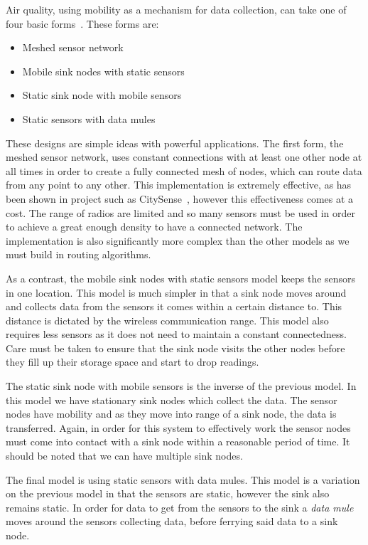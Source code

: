     Air quality, using mobility as a mechanism for data collection, can take one of four basic forms~\cite{datacollectionsurvey}. These forms are:

    \begin{itemize}
        \item Meshed sensor network
        \item Mobile sink nodes with static sensors
        \item Static sink node with mobile sensors
        \item Static sensors with data mules~\cite{datamulesthreeteir}
    \end{itemize}

    These designs are simple ideas with powerful applications. The first form, the meshed sensor network, uses constant connections with at least one other node at all times in order to create a fully connected mesh of nodes, which can route data from any point to any other. This implementation is extremely effective, as has been shown in project such as CitySense~\cite{citysense}, however this effectiveness comes at a cost. The range of radios are limited and so many sensors must be used in order to achieve a great enough density to have a connected network. The implementation is also significantly more complex than the other models as we must build in routing algorithms. 

    As a contrast, the mobile sink nodes with static sensors model keeps the sensors in one location. This model is much simpler in that a sink node moves around and collects data from the sensors it comes within a certain distance to. This distance is dictated by the wireless communication range. This model also requires less sensors as it does not need to maintain a constant connectedness. Care must be taken to ensure that the sink node visits the other nodes before they fill up their storage space and start to drop readings.

    The static sink node with mobile sensors is the inverse of the previous model. In this model we have stationary sink nodes which collect the data. The sensor nodes have mobility and as they move into range of a sink node, the data is transferred. Again, in order for this system to effectively work the sensor nodes must come into contact with a sink node within a reasonable period of time. It should be noted that we can have multiple sink nodes.

    The final model is using static sensors with data mules. This model is a variation on the previous model in that the sensors are static, however the sink also remains static. In order for data to get from the sensors to the sink a \emph{data mule} moves around the sensors collecting data, before ferrying said data to a sink node. 

